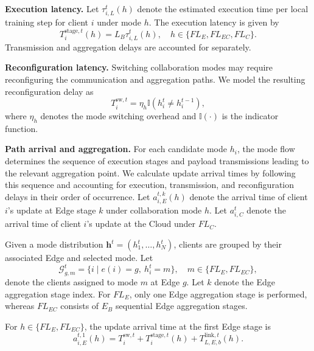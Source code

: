 \documentclass[5p,times]{elsarticle}
\theoremstyle{plain}
\theoremstyle{definition}
\theoremstyle{remark}
\begin{document}
	\textbf{Execution latency.}
	Let \(\tau_{i,L}^t(h)\) denote the estimated
	execution time per local training step for
	client \(i\) under mode \(h\).
	The execution latency is given by
	\begin{equation}
		T_i^{\mathrm{stage},t}(h)
		=
		L_B\tau_{i,L}^t(h),
		\quad
		h\in\{FL_E,FL_{EC},FL_C\}.
		\label{eq:execution_latency}
	\end{equation}
	Transmission and aggregation delays are
	accounted for separately.
	
	\textbf{Reconfiguration latency.}
	Switching collaboration modes may require
	reconfiguring the communication and aggregation
	paths. We model the resulting reconfiguration
	delay as
	\begin{equation}
		T_i^{\mathrm{sw},t}
		=
		\eta_h \mathbb{I}(h_i^t\neq h_i^{t-1}),
		\label{eq:switching_cost}
	\end{equation}
	where \(\eta_h\) denotes the mode switching
	overhead and \(\mathbb{I}(\cdot)\) is the
	indicator function.
	
	\textbf{Path arrival and aggregation.}
	For each candidate mode \(h_i\), the mode flow
	determines the sequence of execution stages
	and payload transmissions leading to the
	relevant aggregation point.
	We calculate update arrival times by
	following this sequence and accounting for
	execution, transmission, and reconfiguration
	delays in their order of occurrence.
	Let \(a_{i,E}^{t,k}(h)\) denote the arrival time
	of client \(i\)'s update at Edge stage \(k\)
	under collaboration mode \(h\). Let \(a_{i,C}^t\)
	denote the arrival time of client \(i\)'s update
	at the Cloud under \(FL_C\).
	
	Given a mode distribution
	$\mathbf h^t=(h_1^t,\ldots,h_N^t)$,
	clients are grouped by their associated Edge
	and selected mode. Let
	\begin{equation}
		\mathcal G_{g,m}^t
		=\{i\mid e(i)=g,\ h_i^t=m\},
		\quad m\in\{FL_E,FL_{EC}\},
		\label{eq:edge_mode_group}
	\end{equation}
	denote the clients assigned to mode $m$
	at Edge $g$. Let \(k\) denote the
	Edge aggregation stage index. For \(FL_E\),
	only one Edge aggregation stage is performed,
	whereas \(FL_{EC}\) consists of \(E_B\)
	sequential Edge aggregation stages.
	
	For \(h\in\{FL_E,FL_{EC}\}\), the update
	arrival time at the first Edge stage is
	\begin{equation}
		a_{i,E}^{t,1}(h)
		=
		T_i^{\mathrm{sw},t}
		+
		T_i^{\mathrm{stage},t}(h)
		+
		T_{L,E,b}^{\mathrm{link},t}(h).
	\end{equation}
	
\end{document}

